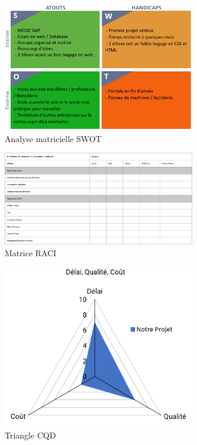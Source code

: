 \documentclass[french,a4paper]{article}
\begin{document}
\begin{figure}[h]
    \centering
    \includegraphics[width=0.75\textwidth]{img/SWOT.png}
    \caption{Analyse matricielle SWOT}
\end{figure}

\begin{figure}[h]
    \centering
    \includegraphics[width=0.75\textwidth]{img/RACI.png}
    \caption{Matrice RACI}
\end{figure}

\begin{figure}[h]
    \centering
    \includegraphics[width=0.75\textwidth]{img/triangle_QCD.png}
    \caption{Triangle CQD}
\end{figure}
\end{document}
